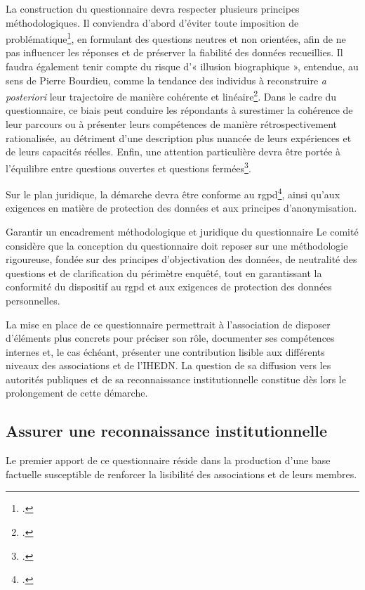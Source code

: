 \documentclass[12pt,a4paper]{article}
\begin{document}
La construction du questionnaire devra respecter plusieurs principes méthodologiques. Il conviendra d'abord d'éviter toute imposition de problématique\footcite{Bourdieu1986}, en formulant des questions neutres et non orientées, afin de ne pas influencer les réponses et de préserver la fiabilité des données recueillies. Il faudra également tenir compte du risque d'« illusion biographique », entendue, au sens de Pierre Bourdieu, comme la tendance des individus à reconstruire \textit{a posteriori} leur trajectoire de manière cohérente et linéaire\footcite[69]{Bourdieu1986}. Dans le cadre du questionnaire, ce biais peut conduire les répondants à surestimer la cohérence de leur parcours ou à présenter leurs compétences de manière rétrospectivement rationalisée, au détriment d'une description plus nuancée de leurs expériences et de leurs capacités réelles. Enfin, une attention particulière devra être portée à l'équilibre entre questions ouvertes et questions fermées\footcite[65]{Fenneteau2015}.

Sur le plan juridique, la démarche devra être conforme au \gls{rgpd}\footcite{RGPD_CNIL}, ainsi qu'aux exigences en matière de protection des données et aux principes d'anonymisation.

\begin{proposition}{Garantir un encadrement méthodologique et juridique du questionnaire}
Le comité considère que la conception du questionnaire doit reposer sur une méthodologie rigoureuse, fondée sur des principes d'objectivation des données, de neutralité des questions et de clarification du périmètre enquêté, tout en garantissant la conformité du dispositif au \gls{rgpd} et aux exigences de protection des données personnelles.
\end{proposition}

La mise en place de ce questionnaire permettrait à l'association de disposer d'éléments plus concrets pour préciser son rôle, documenter ses compétences internes et, le cas échéant, présenter une contribution lisible aux différents niveaux des associations et de l'IHEDN. La question de sa diffusion vers les autorités publiques et de sa reconnaissance institutionnelle constitue dès lors le prolongement de cette démarche.
\clearpage

\subsection{Assurer une reconnaissance institutionnelle}

Le premier apport de ce questionnaire réside dans la production d'une base factuelle susceptible de renforcer la lisibilité des associations et de leurs membres.
\end{document}
